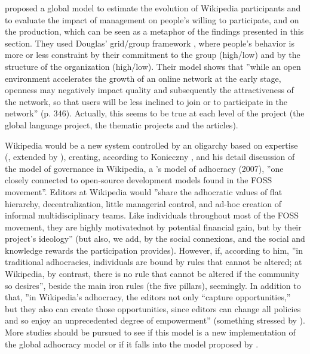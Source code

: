 \citet{OttoSimon08} proposed a global model to estimate the evolution
of Wikipedia participants and to evaluate the impact of management
on people's willing to participate, and on the production, which can
be seen as a metaphor of the findings presented in this section. They
used Douglas' grid/group framework \citeyearpar{Douglas70,Douglas78},
where people's behavior is more or less constraint by their commitment
to the group (high/low) and by the structure of the organization (high/low).
Their model shows that ''while an open environment accelerates the
growth of an online network at the early stage, openness may negatively
impact quality and subsequently the attractiveness of the network,
so that users will be less inclined to join or to participate in the
network'' (p. 346). Actually, this seems to be true at each level
of the project (the global language project, the thematic projects
and the articles).

Wikipedia would be a new system controlled by an oligarchy based on
expertise (\citet{HansenBerenteLyytinen09,Hartelius10}, extended
by \citealp{Pfister11}), creating, according to Konieczny \citeyearpar{Konieczny09,Konieczny10},
and his detail discussion of the model of governance in Wikipedia,
a \citeauthor{Mintzberg07}'s model of adhocracy (2007), ''one closely
connected to open-source development models found in the FOSS movement''.
Editors at Wikipedia would ''share the adhocratic values of flat
hierarchy, decentralization, little managerial control, and ad-hoc
creation of informal multidisciplinary teams. Like individuals throughout
most of the FOSS movement, they are highly motivated\textemdash not
by potential financial gain, but by their project\textquoteright s
ideology'' \citep[p. 277]{Konieczny10} (but also, we add, by the
social connexions, and the social and knowledge rewards the participation
provides). However, if, according to him, ''in traditional adhocracies,
individuals are bound by rules that cannot be altered; at Wikipedia,
by contrast, there is no rule that cannot be altered if the community
so desires'', beside the main iron rules (the five pillars), seemingly.
In addition to that, ''in Wikipedia\textquoteright s adhocracy, the
editors not only \textquotedblleft capture opportunities,\textquotedblright{}
but they also can create those opportunities, since editors can change
all policies and so enjoy an unprecedented degree of empowerment''
(something stressed by \citealp{HansenBerenteLyytinen09,Hartelius10,Pfister11}).
More studies should be pursued to see if this model is a new implementation
of the global adhocracy model or if it falls into the model proposed
by \citet{MintzbergMcHugh05}.